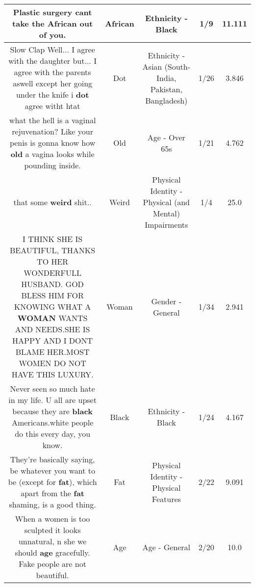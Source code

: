 \documentclass[11pt]{article}
\newlength\mylength
\begin{document}
\begin{center}
\begin{longtable}{|C{.65\mylength}|C{.30\mylength}|C{.12\mylength}|C{.12\mylength}|C{.12\mylength}|}
  \small Plastic surgery cant take the \textbf{African} out of you.\normalsize   & African & Ethnicity - Black & 1/9 & 11.111 \\  \hline
  \small Slow Clap Well... I agree with the daughter but... I agree with the parents aswell except her going under the knife i \textbf{dot} agree witht htat\normalsize   & Dot & Ethnicity - Asian (South- India, Pakistan, Bangladesh) & 1/26 & 3.846 \\  \hline
  \small what the hell is a vaginal rejuvenation? Like your penis is gonna know how \textbf{old} a vagina looks while pounding inside.\normalsize   & Old & Age - Over 65s & 1/21 & 4.762 \\  \hline
  \small that some \textbf{weird} shit..\normalsize   & Weird & Physical Identity - Physical (and Mental) Impairments & 1/4 & 25.0 \\  \hline
  \small I THINK SHE IS BEAUTIFUL, THANKS TO HER WONDERFULL HUSBAND. GOD BLESS HIM FOR KNOWING WHAT A \textbf{WOMAN} WANTS AND NEEDS.SHE IS HAPPY AND I DONT BLAME HER.MOST WOMEN DO NOT HAVE THIS LUXURY.\normalsize   & Woman & Gender - General & 1/34 & 2.941 \\  \hline
  \small Never seen so much hate in my life. U all are upset because they are \textbf{black} Americans.white people do this every day, you know.\normalsize   & Black & Ethnicity - Black & 1/24 & 4.167 \\  \hline
  \small They're basically saying, be whatever you want to be (except for \textbf{fat}), which apart from the \textbf{fat} shaming, is a good thing.\normalsize   & Fat & Physical Identity - Physical Features & 2/22 & 9.091 \\  \hline
  \small When a women is too sculpted it looks unnatural, n she we should \textbf{age} gracefully. Fake people are not beautiful.\normalsize   & Age & Age - General & 2/20 & 10.0 \\  \hline

\end{longtable}
\end{center}
\end{document}
